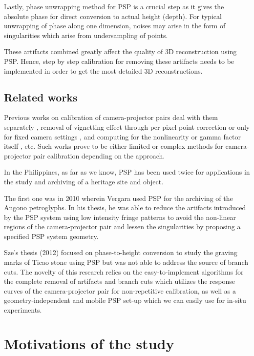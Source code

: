 Lastly, phase unwrapping method for PSP is a crucial step as it gives the absolute phase for direct conversion to actual height (depth). For typical unwrapping of phase along one dimension, noises may arise in the form of singularities which arise from undersampling of points. 

These artifacts combined greatly affect the quality of 3D reconstruction using PSP.
Hence, step by step calibration for removing these artifacts needs to be implemented in order to get the most detailed 3D reconstructions. 

\subsection{Related works}

Previous works on calibration of camera-projector pairs deal with them separately \cite{Fernandez2011}, removal of vignetting effect through per-pixel point correction\cite{Yu2004} or only for fixed camera settings \cite{Goldman}, and computing for the nonlinearity or gamma factor itself \cite{Wang2014, Baker2008}, etc. 
Such works prove to be either limited or complex methods for camera-projector pair calibration depending on the approach.

In the Philippines, as far as we know, PSP has been used twice for applications in the study and archiving of a heritage site and object. 

The first one was in 2010 wherein Vergara used PSP for the archiving of the Angono petroglyphs. 
In his thesis, he was able to reduce the artifacts introduced by the PSP system using low intensity fringe patterns to avoid the non-linear regions of the camera-projector pair and lessen the singularities by proposing a specified PSP system geometry. 

Sze’s thesis (2012) focused on phase-to-height conversion to study the graving marks of Ticao stone using PSP but was not able to address the source of branch cuts. The novelty of this research relies on the easy-to-implement algorithms for the complete removal of artifacts and branch cuts which utilizes the response curves of the camera-projector pair for non-repetitive calibration, as well as a geometry-independent and mobile PSP set-up which we can easily use for in-situ experiments.

\section{Motivations of the study}

